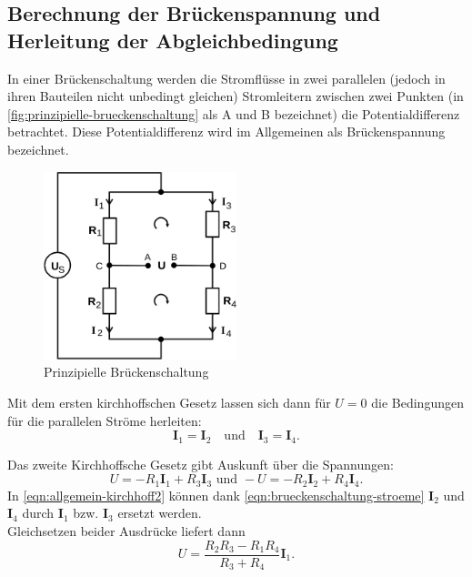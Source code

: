 \subsection{Berechnung der Brückenspannung und Herleitung der 
Abgleichbedingung}
\label{sec:abgleichbedingung}

In einer Brückenschaltung werden die Stromflüsse in zwei parallelen (jedoch in ihren
Bauteilen nicht unbedingt gleichen) Stromleitern zwischen zwei Punkten (in 
\autoref{fig:prinzipielle-brueckenschaltung} als A und B bezeichnet) die Potentialdifferenz 
betrachtet.
Diese Potentialdifferenz wird im Allgemeinen als Brückenspannung bezeichnet.

\begin{figure}[H]
	\centering
	\includegraphics[width=0.5\textwidth]{bilder/prinzipielle-brueckenschaltung.png}
	\caption{Prinzipielle Brückenschaltung}
	\label{fig:prinzipielle-brueckenschaltung}
\end{figure}

Mit dem ersten kirchhoffschen Gesetz lassen sich dann für $U=0$ die Bedingungen für
die parallelen Ströme herleiten:
\begin{equation}
	\mathbf{I}_1 = \mathbf{I}_2
	\quad \text{und} \quad
	\mathbf{I}_3 = \mathbf{I}_4.
	\label{eqn:brueckenschaltung-stroeme}
\end{equation}

Das zweite Kirchhoffsche Gesetz gibt Auskunft über die Spannungen:
\begin{equation}
	U = - R_1 \mathbf{I}_1 + R_3 \mathbf{I}_3
	\text{ und }
	-U = -R_2 \mathbf{I}_2 + R_4 \mathbf{I}_4.
	\label{eqn:allgemein-kirchhoff2}
\end{equation}
In \autoref{eqn:allgemein-kirchhoff2} können dank \autoref{eqn:brueckenschaltung-stroeme} 
$\mathbf{I}_2$ und $\mathbf{I}_4$ durch $\mathbf{I}_1$ bzw. $\mathbf{I}_3$ ersetzt werden.
\\
Gleichsetzen beider Ausdrücke liefert dann
\begin{equation}
	U = \frac{R_2 R_3 - R_1 R_4}{R_3 + R_4} \mathbf{I}_1.
	\label{eqn:ablgeich-abhaengig}
\end{equation}

